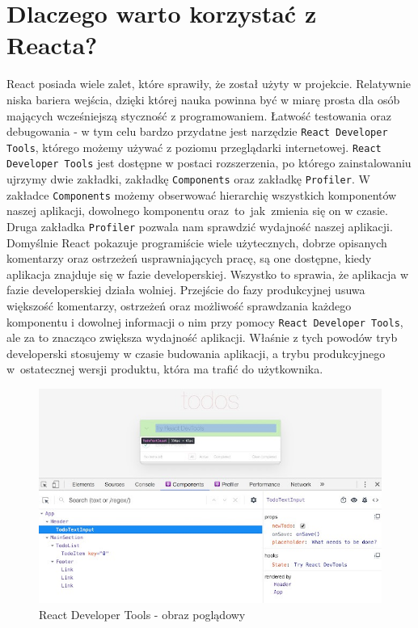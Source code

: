 \documentclass[oneside,polski,logo,indent]{amuthesis}
\begin{document}
\section{Dlaczego warto korzystać z Reacta?}{
React posiada wiele zalet, które sprawiły, że został użyty w projekcie. Relatywnie niska bariera wejścia, dzięki której nauka powinna być w miarę prosta dla osób mających wcześniejszą styczność z programowaniem. Łatwość testowania oraz debugowania - w tym celu bardzo przydatne jest narzędzie \texttt{React Developer Tools}, którego możemy używać z poziomu przeglądarki internetowej. \texttt{React Developer Tools} jest dostępne w postaci rozszerzenia, po którego zainstalowaniu ujrzymy dwie zakładki, zakładkę \texttt{Components} oraz zakładkę \texttt{Profiler}. W zakładce \texttt{Components} możemy obserwować hierarchię wszystkich komponentów naszej aplikacji, dowolnego komponentu oraz~to~jak~zmienia się on w czasie. Druga zakładka \texttt{Profiler} pozwala nam sprawdzić wydajność naszej aplikacji. Domyślnie React pokazuje programiście wiele użytecznych, dobrze opisanych komentarzy oraz ostrzeżeń usprawniających pracę, są one dostępne, kiedy aplikacja znajduje się w fazie developerskiej. Wszystko to sprawia, że aplikacja w fazie developerskiej działa wolniej. Przejście do fazy produkcyjnej usuwa większość komentarzy, ostrzeżeń oraz możliwość sprawdzania każdego komponentu i dowolnej informacji o nim przy pomocy \texttt{React Developer Tools}, ale za to znacząco zwiększa wydajność aplikacji.
Właśnie z tych powodów tryb developerski stosujemy w czasie budowania aplikacji, a trybu produkcyjnego w~ostatecznej wersji produktu, która ma trafić do użytkownika.
\begin{figure}[H]
\centering
\includegraphics[width=13cm]{react dev example.jpg}
\caption{React Developer Tools - obraz poglądowy
}
\end{figure}}
\end{document}
